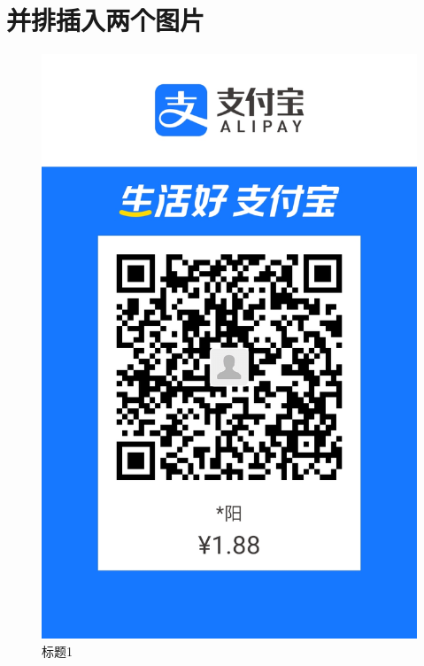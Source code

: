 \documentclass{article}
\begin{document}
\section{并排插入两个图片}
\begin{figure}[hbt]
	\begin{minipage}[t]{0.5\textwidth}
		\centering
		\includegraphics[scale=0.2]{1.jpg}
		\caption{标题1}
	\end{minipage}
	\qquad
	\begin{minipage}[t]{0.5\textwidth}
		\centering

\end{minipage}
\end{figure}
\end{document}
